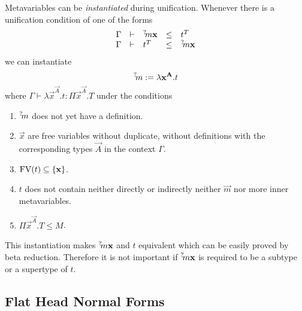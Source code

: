 Metavariables can be \emph{instantiated} during unification. Whenever there is a
unification condition of one of the forms
$$
\begin{array}{lllll}
    \Gamma &\vdash &{{}^? \kern-0.2em m} {\mathbf x} &\le &t^T
    \\
    \Gamma &\vdash &t^T &\le &{{}^? \kern-0.2em m} {\mathbf x}
\end{array}
$$
we can instantiate
$$
    {{}^? \kern-0.2em m} := \lambda {\mathbf x} ^{{\mathbf A}}. t
$$
where $\Gamma \vdash \lambda \vec x^{\vec A}. t : \Pi \vec x^{\vec A}. T$ under
the conditions
\begin{enumerate}

    \item ${{}^? \kern-0.2em m}$ does not yet have a definition.

    \item $\vec x$ are free variables without duplicate, without definitions
        with the corresponding types $\vec A$ in the context $\Gamma$.

    \item $\text{FV}(t) \subseteq {\{{\mathbf x}\}}$.

    \item $t$ does not contain neither directly or indirectly neither $\vec m$
        nor more inner metavariables.

    \item $\Pi \vec x^{\vec A}. T \le M$.
\end{enumerate}

This instantiation makes ${{}^? \kern-0.2em m} {\mathbf x}$ and $t$ equivalent which can be easily
proved by beta reduction. Therefore it is not important if
${{}^? \kern-0.2em m} {\mathbf x}$ is required to be a subtype or a supertype of $t$.



\subsection{Flat Head Normal Forms}



